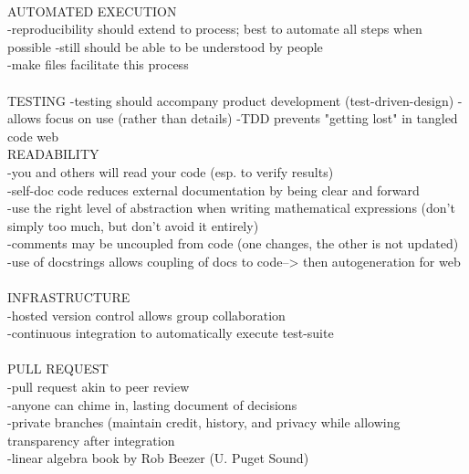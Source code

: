 \documentclass{report}
\begin{document}
\-\\
AUTOMATED EXECUTION\\
-reproducibility should extend to process; best to automate all steps when possible
-still should be able to be understood by people\\
-make files facilitate this process\\
\-\\
TESTING
-testing should accompany product development (test-driven-design)
-allows focus on use (rather than details)
-TDD prevents "getting lost" in tangled code web
\-\\
READABILITY\\
-you and others will read your code (esp. to verify results)\\
-self-doc code reduces external documentation by being clear and forward\\
-use the right level of abstraction when writing mathematical expressions (don't simply too much, but don't avoid it entirely)\\
-comments may be uncoupled from code (one changes, the other is not updated)\\
-use of docstrings allows coupling of docs to code--> then autogeneration for web\\
\-\\
INFRASTRUCTURE\\
-hosted version control allows group collaboration\\
-continuous integration to automatically execute test-suite\\
\-\\
PULL REQUEST\\
-pull request akin to peer review\\
-anyone can chime in, lasting document of decisions\\
-private branches (maintain credit, history, and privacy while allowing transparency after integration\\

-linear algebra book by Rob Beezer (U. Puget Sound)
\end{document}
